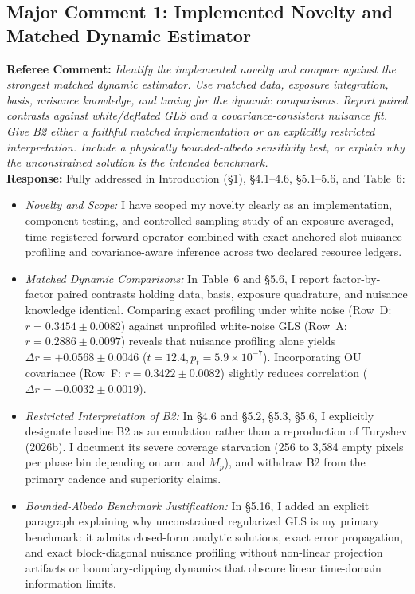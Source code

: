 \documentclass[11pt]{article}
\begin{document}
\subsection*{Major Comment 1: Implemented Novelty and Matched Dynamic Estimator}
\textbf{Referee Comment:} \textit{Identify the implemented novelty and compare against the strongest matched dynamic estimator. Use matched data, exposure integration, basis, nuisance knowledge, and tuning for the dynamic comparisons. Report paired contrasts against white/deflated GLS and a covariance-consistent nuisance fit. Give B2 either a faithful matched implementation or an explicitly restricted interpretation. Include a physically bounded-albedo sensitivity test, or explain why the unconstrained solution is the intended benchmark.}\\
\textbf{Response:} Fully addressed in Introduction (§1), §4.1--4.6, §5.1--5.6, and Table~6:
\begin{itemize}
    \item \textit{Novelty and Scope:} I have scoped my novelty clearly as an implementation, component testing, and controlled sampling study of an exposure-averaged, time-registered forward operator combined with exact anchored slot-nuisance profiling and covariance-aware inference across two declared resource ledgers.
    \item \textit{Matched Dynamic Comparisons:} In Table~6 and §5.6, I report factor-by-factor paired contrasts holding data, basis, exposure quadrature, and nuisance knowledge identical. Comparing exact profiling under white noise (Row~D: $r = 0.3454 \pm 0.0082$) against unprofiled white-noise GLS (Row~A: $r = 0.2886 \pm 0.0097$) reveals that nuisance profiling alone yields $\Delta r = +0.0568 \pm 0.0046$ ($t = 12.4, p_t = 5.9\times 10^{-7}$). Incorporating OU covariance (Row~F: $r = 0.3422 \pm 0.0082$) slightly reduces correlation ($\Delta r = -0.0032 \pm 0.0019$).
    \item \textit{Restricted Interpretation of B2:} In §4.6 and §5.2, §5.3, §5.6, I explicitly designate baseline B2 as an emulation rather than a reproduction of Turyshev (2026b). I document its severe coverage starvation (256 to 3,584 empty pixels per phase bin depending on arm and $M_p$), and withdraw B2 from the primary cadence and superiority claims.
    \item \textit{Bounded-Albedo Benchmark Justification:} In §5.16, I added an explicit paragraph explaining why unconstrained regularized GLS is my primary benchmark: it admits closed-form analytic solutions, exact error propagation, and exact block-diagonal nuisance profiling without non-linear projection artifacts or boundary-clipping dynamics that obscure linear time-domain information limits.
\end{itemize}
\end{document}
